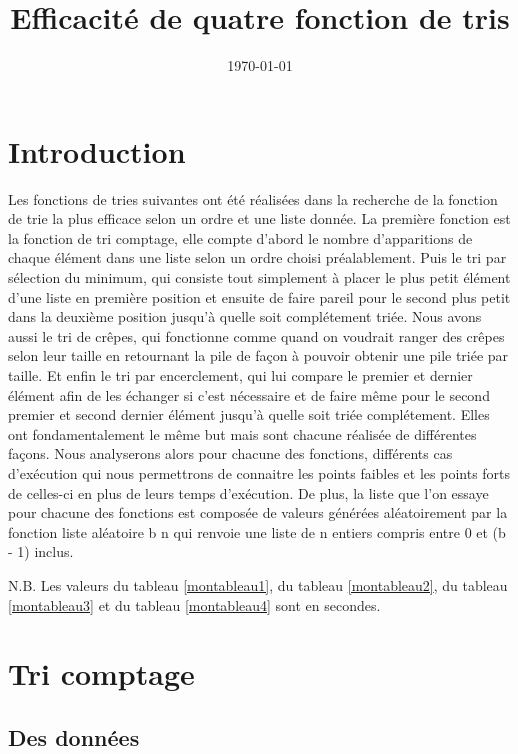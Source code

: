 \documentclass[a4paper, 12pt]{article}
\title{Efficacité de quatre fonction de tris}
\date{\today}
\begin{document}
\maketitle

\newpage

\tableofcontents

\newpage
\section{Introduction}

Les fonctions de tries suivantes ont été réalisées dans la recherche de la fonction de trie la plus efficace selon un ordre et une liste donnée. La première fonction est la fonction de tri comptage, elle compte d’abord le nombre d’apparitions de chaque élément dans une liste selon un ordre choisi préalablement. Puis le tri par sélection du minimum, qui consiste tout simplement à placer le plus petit élément d’une liste en première position et ensuite de faire pareil pour le second plus petit dans la deuxième position jusqu’à quelle soit complétement triée. Nous avons aussi le tri de crêpes, qui fonctionne comme quand on voudrait ranger des crêpes selon leur taille en retournant la pile de façon à pouvoir obtenir une pile triée par taille. Et enfin le tri par encerclement, qui lui compare le premier et dernier élément afin de les échanger si c’est nécessaire et de faire même pour le second premier et second dernier élément jusqu’à quelle soit triée complétement. Elles ont fondamentalement le même but mais sont chacune réalisée de différentes façons. Nous analyserons alors pour chacune des fonctions, différents cas d’exécution qui nous permettrons de connaitre les points faibles et les points forts de celles-ci en plus de leurs temps d’exécution. De plus, la liste que l’on essaye pour chacune des fonctions est composée de valeurs générées aléatoirement par la fonction liste aléatoire b n qui renvoie une liste de n entiers compris entre 0 et (b - 1) inclus. 

N.B. Les valeurs du tableau  \ref{montableau1}, du tableau  \ref{montableau2}, du tableau \ref{montableau3} et du tableau  \ref{montableau4} sont en secondes.

\section{Tri comptage}
\subsection{Des données}
\end{document}
